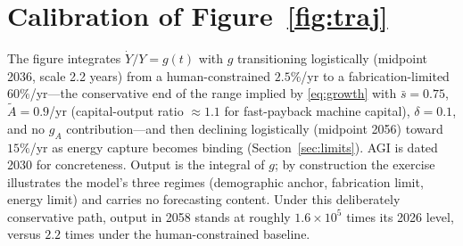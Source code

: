 \documentclass[11pt]{article}
\begin{document}
\section{Calibration of Figure~\ref{fig:traj}}\label{app:calib}

The figure integrates $\dot Y/Y = g(t)$ with $g$ transitioning logistically (midpoint 2036, scale 2.2 years) from a human-constrained $2.5\%$/yr to a fabrication-limited $60\%$/yr---the conservative end of the range implied by \eqref{eq:growth} with $\bar s = 0.75$, $\tilde A = 0.9$/yr (capital-output ratio $\approx 1.1$ for fast-payback machine capital), $\delta = 0.1$, and no $g_A$ contribution---and then declining logistically (midpoint 2056) toward $15\%$/yr as energy capture becomes binding (Section~\ref{sec:limits}). AGI is dated 2030 for concreteness. Output is the integral of $g$; by construction the exercise illustrates the model's three regimes (demographic anchor, fabrication limit, energy limit) and carries no forecasting content. Under this deliberately conservative path, output in 2058 stands at roughly $1.6\times 10^{5}$ times its 2026 level, versus $2.2$ times under the human-constrained baseline.
\end{document}
